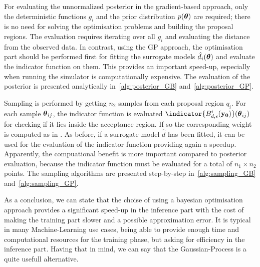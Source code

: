 \noindent
For evaluating the unnormalized posterior in the gradient-based
approach, only the deterministic functions $g_i$ and the prior
distribution $p(\boldsymbol{\theta})$ are required; there is no need for solving
the optimisation problems and building the proposal regions. The
evaluation requires iterating over all $g_i$ and evaluating the
distance from the observed data. In contrast, using the GP approach,
the optimisation part should be performed first for fitting the
surrogate models $\hat{d}_i(\boldsymbol{\theta})$ and evaluate the indicator
function on them. This provides an important speed-up, especially when
running the simulator is computationally expensive. The evaluation of
the posterior is presented analytically in~\ref{alg:posterior_GB}
and~\ref{alg:posterior_GP}.

\noindent
Sampling is performed by getting $n_2$ samples from each proposal
region $q_i$. For each sample $\boldsymbol{\theta}_{ij}$, the indicator function
is evaluated $\indicator{\regioni(\data)}(\thetab_{ij})$ for checking
if it lies inside the acceptance region. If so the corresponding
weight is computed as in \autocite{eq:sampling}. As before, if a surrogate
model $\hat{d}$ has been fitted, it can be used for the evaluation of
the indicator function providing again a speedup. Apparently, the
compuational benefit is more important compared to posterior
evaluation, because the indicator function must be evaluated for a
total of $n_1 \times n_2$ points. The sampling algorithms are
presented step-by-step in~\ref{alg:sampling_GB}
and~\ref{alg:sampling_GP}.

\noindent
As a conclusion, we can state that the choise of using a bayesian
optimisation approach provides a significant speed-up in the inference
part with the cost of making the training part slower and a possible
approximation error. It is typical in many Machine-Learning use cases,
being able to provide enough time and computational resources for the
training phase, but asking for efficiency in the inference
part. Having that in mind, we can say that the Gaussian-Process is a
quite usefull alternative.

